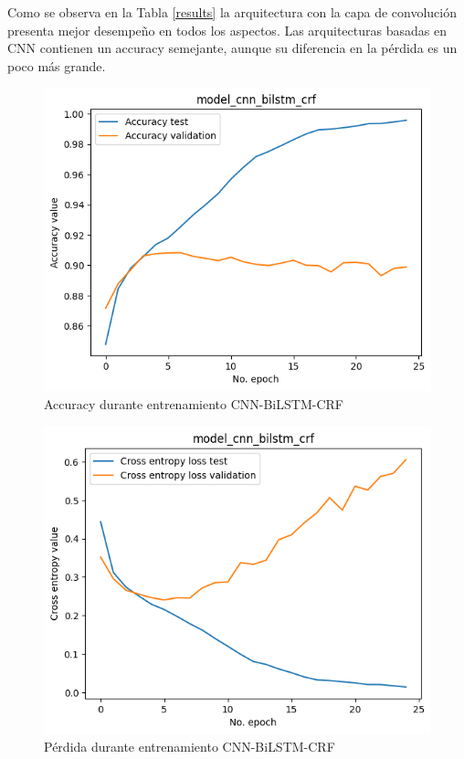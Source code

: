 \documentclass[runningheads]{llncs}
\begin{document}
Como se observa en la Tabla \ref{results} la arquitectura con la capa de convolución
presenta mejor desempeño en todos los aspectos. Las arquitecturas basadas en CNN 
contienen un accuracy semejante, aunque su diferencia en la pérdida es un poco más
grande.

\begin{figure}
	\centering
	\includegraphics[width=12cm]{model_cnn_bilstm_crf_acc.png}
	\caption{Accuracy durante entrenamiento CNN-BiLSTM-CRF}
	\label{acc_fig}
\end{figure}

\begin{figure}
	\centering
	\includegraphics[width=12cm]{model_cnn_bilstm_crf_loss.png}
	\caption{Pérdida durante entrenamiento CNN-BiLSTM-CRF}
	\label{loss_fig}
\end{figure}
\end{document}
